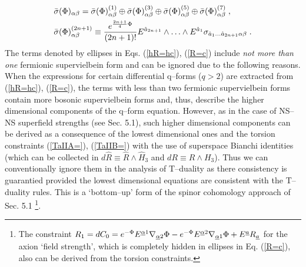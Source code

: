 \documentclass[a4paper,11pt]{article}
\begin{document}
\begin{eqnarray}\label{bs=sum}
& \bar{\sigma}({\Phi})_{ {\alpha} {\beta}} 
= 
\bar{\sigma}({\Phi})^{(1)}_{ {\alpha} {\beta}}  \oplus 
\bar{\sigma}({\Phi})^{(3)}_{ {\alpha} {\beta}}  \oplus 
\bar{\sigma}({\Phi})^{(5)}_{ {\alpha} {\beta}}  \oplus 
\bar{\sigma}({\Phi})^{(7)}_{ {\alpha} {\beta}}  \; , \\ 
& \label{bs2n1}
\bar{\sigma}({\Phi})^{(2n+1)}_{ {\alpha} {\beta}} 
\equiv 
 {e^{{2n+1\over 4}{\Phi} }\over (2n+1)!} 
{E}^{ {\hat{a}}_{2n+1}}
\wedge \ldots \wedge {E}^{ {\hat{a}}_{1}}
\sigma_{ {\hat{a}}_{1} \ldots {\hat{a}}_{2n+1} {\alpha}
 {\beta}}\; . 
\end{eqnarray}
The terms denoted by ellipses in Eqs. (\ref{hR=hc}), (\ref{R=c})
include {\sl not more than one}  fermionic supervielbein form
and can be ignored due to the following reasons.  
When the expressions for certain differential q--forms ($q>2$) are extracted 
from  (\ref{hR=hc}), (\ref{R=c}), the terms with less than two 
fermionic supervielbein forms contain more bosonic supervielbein forms  
and, thus, describe  the higher dimensional components of the 
q--form equation. 
However, as in the case of NS--NS superfield strengths (see Sec. 5.1), 
such higher dimensional components  
can be derived as a consequence of the 
lowest dimensional ones and the torsion constraints 
(\ref{TaIIA=}), (\ref{TaIIB=})  
with the use of superspace Bianchi identities 
(which can be collected in $d\hat{R}\equiv \hat{R}\wedge \hat{H}_3$ 
and $d{R}\equiv {R}\wedge {H}_3$). 
Thus we can conventionally ignore them in the analysis of T--duality as there 
consistency is guarantied provided the lowest dimensional equations 
are consistent with the T--duality rules.  
This is a `bottom--up' form of the spinor cohomology approach of Sec. 5.1
\footnote{The constraint 
$R_1 =  dC_0 =
e^{- \Phi}
 E^{\underline{\alpha}1}
\nabla_{\underline{\alpha}2}\Phi
-
e^{- \Phi}
E^{\underline{\alpha}2}
\nabla_{\underline{\alpha}1}\Phi
+
E^{\underline{a}} R_{\underline{a}}$ for the axion `field strength', 
which is completely hidden in ellipses in Eq. (\ref{R=c}),  
also can be derived from the torsion constraints.}.  
\end{document}
